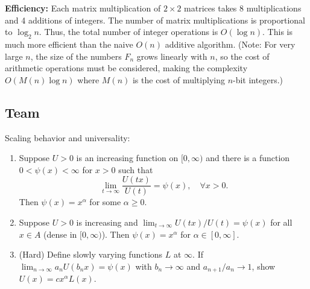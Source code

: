 \begin{solution}
\textbf{Efficiency:}
Each matrix multiplication of $2 \times 2$ matrices takes 8 multiplications and 4 additions of integers.
The number of matrix multiplications is proportional to $\log_2 n$.
Thus, the total number of integer operations is $O(\log n)$.
This is much more efficient than the naive $O(n)$ additive algorithm.
(Note: For very large $n$, the size of the numbers $F_n$ grows linearly with $n$, so the cost of arithmetic operations must be considered, making the complexity $O(M(n) \log n)$ where $M(n)$ is the cost of multiplying $n$-bit integers.)
\end{solution}

\subsection{Team}

\begin{exercise}
\label{applied:2013:7}
Scaling behavior and universality:
\begin{enumerate}
    \item[(a)] Suppose $U > 0$ is an increasing function on $[0, \infty)$ and there is a function $0 < \psi(x) < \infty$ for $x > 0$ such that
    \[ \lim_{t \to \infty} \frac{U(tx)}{U(t)} = \psi(x), \quad \forall x > 0. \]
    Then $\psi(x) = x^\alpha$ for some $\alpha \geq 0$.
    \item[(b)] Suppose $U > 0$ is increasing and $\lim_{t \to \infty} U(tx)/U(t) = \psi(x)$ for all $x \in A$ (dense in $[0, \infty)$). Then $\psi(x) = x^\alpha$ for $\alpha \in [0, \infty]$.
    \item[(c)] (Hard) Define slowly varying functions $L$ at $\infty$. If $\lim_{n \to \infty} a_n U(b_n x) = \psi(x)$ with $b_n \to \infty$ and $a_{n+1}/a_n \to 1$, show $U(x) = c x^\alpha L(x)$.
\end{enumerate}
\end{exercise}

